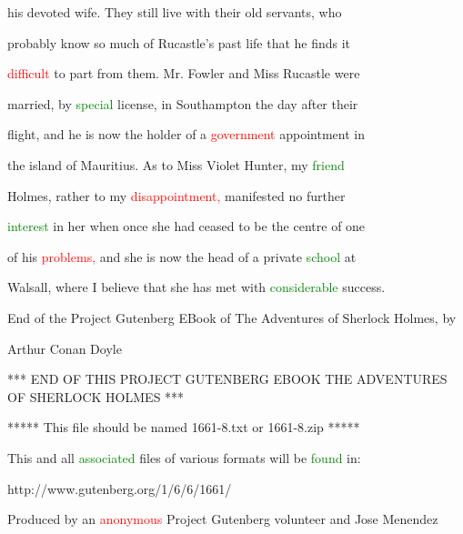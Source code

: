  his devoted wife. They still live with their old \textcolor{BurntOrange}{servants,} who

 probably know so much of Rucastle's past life that he finds it

 \textcolor{red}{difficult} to part from them. Mr. Fowler and Miss Rucastle were

 married, by \textcolor{green}{special} license, in Southampton the day after their

 flight, and he is now the holder of a \textcolor{red}{government} appointment in

 the island of Mauritius. As to Miss Violet \textcolor{BurntOrange}{Hunter,} my \textcolor{green}{friend}

 Holmes, rather to my \textcolor{red}{disappointment,} manifested no further

 \textcolor{green}{interest} in her when once she had ceased to be the centre of one

 of his \textcolor{red}{problems,} and she is now the head of a private \textcolor{green}{school} at

 Walsall, where I believe that she has met with \textcolor{green}{considerable} \textcolor{BurntOrange}{success.}



















 End of the Project Gutenberg EBook of The \textcolor{BurntOrange}{Adventures} of Sherlock Holmes, by

 Arthur Conan Doyle



 *** END OF THIS PROJECT GUTENBERG EBOOK THE \textcolor{BurntOrange}{ADVENTURES} OF SHERLOCK HOLMES ***



 ***** This file should be named 1661-8.txt or 1661-8.zip *****

 This and all \textcolor{green}{associated} files of various formats will be \textcolor{green}{found} in:

 http://www.gutenberg.org/1/6/6/1661/



 Produced by an \textcolor{red}{anonymous} Project Gutenberg \textcolor{BurntOrange}{volunteer} and Jose Menendez



